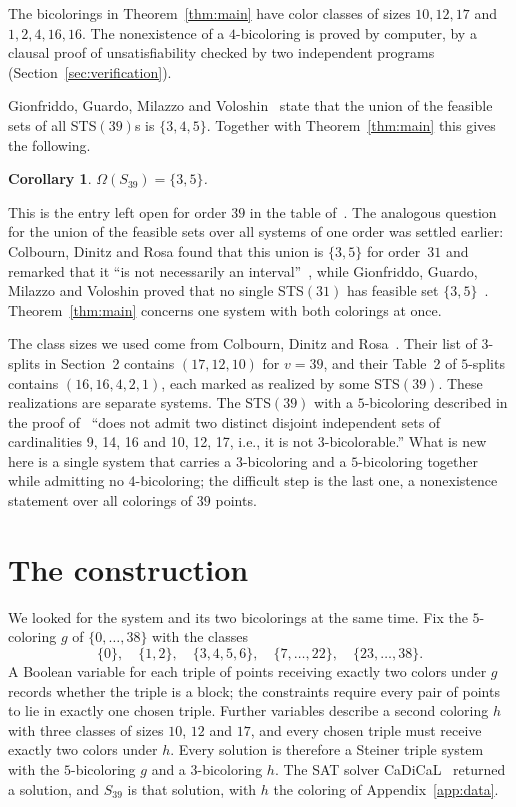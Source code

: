 \documentclass[11pt]{article}
\newtheorem{corollary}[theorem]{Corollary}
\theoremstyle{definition}
\begin{document}
The bicolorings in Theorem~\ref{thm:main} have color classes of sizes
$10,12,17$ and $1,2,4,16,16$. The nonexistence of a $4$-bicoloring is
proved by computer, by a clausal proof of unsatisfiability checked by two
independent programs (Section~\ref{sec:verification}).

Gionfriddo, Guardo, Milazzo and Voloshin~\cite[Theorem~3.7]{GGMV14} state
that the union of the feasible sets of all STS$(39)$s is $\{3,4,5\}$.
Together with Theorem~\ref{thm:main} this gives the following.

\begin{corollary}\label{cor:omega}
$\Omega(S_{39})=\{3,5\}$.
\end{corollary}

This is the entry left open for order $39$ in the table
of~\cite{GGMV14}. The analogous question for the union of the feasible
sets over all systems of one order was settled earlier: Colbourn, Dinitz
and Rosa found that this union is $\{3,5\}$ for order~$31$ and remarked
that it ``is not necessarily an interval''~\cite[Section~4]{CDR}, while
Gionfriddo, Guardo, Milazzo and Voloshin proved that no single STS$(31)$
has feasible set $\{3,5\}$~\cite[Theorem~3.1]{GGMV14}. Theorem~\ref{thm:main}
concerns one system with both colorings at once.

The class sizes we used come from Colbourn, Dinitz and Rosa~\cite{CDR}.
Their list of $3$-splits in Section~2 contains $(17,12,10)$ for $v=39$,
and their Table~2 of $5$-splits contains $(16,16,4,2,1)$, each marked as
realized by some STS$(39)$. These realizations are separate systems. The
STS$(39)$ with a $5$-bicoloring described in the proof
of~\cite[Theorem~3.7]{GGMV14} ``does not admit two distinct disjoint
independent sets of cardinalities 9, 14, 16 and 10, 12, 17, i.e., it is
not 3-bicolorable.'' What is new here is a single system that carries a
$3$-bicoloring and a $5$-bicoloring together while admitting no
$4$-bicoloring; the difficult step is the last one, a nonexistence
statement over all colorings of $39$ points.

\section{The construction}\label{sec:construction}

We looked for the system and its two bicolorings at the same time. Fix
the $5$-coloring $g$ of $\{0,\dots,38\}$ with the classes
\[
\{0\},\quad \{1,2\},\quad \{3,4,5,6\},\quad \{7,\dots,22\},\quad \{23,\dots,38\}.
\]
A Boolean variable for each triple of points receiving exactly two colors
under $g$ records whether the triple is a block; the constraints require
every pair of points to lie in exactly one chosen triple. Further
variables describe a second coloring $h$ with three classes of sizes
$10$, $12$ and $17$, and every chosen triple must receive exactly two
colors under $h$. Every solution is therefore a Steiner triple system with
the $5$-bicoloring $g$ and a $3$-bicoloring $h$. The SAT solver
CaDiCaL~\cite{CaDiCaL} returned a solution, and $S_{39}$ is that solution,
with $h$ the coloring of Appendix~\ref{app:data}.
\end{document}
